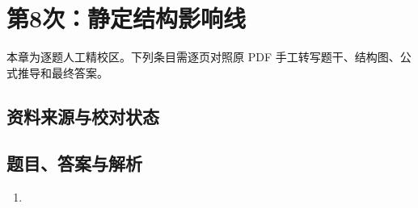 \chapter{第8次：静定结构影响线}

本章为逐题人工精校区。下列条目需逐页对照原 PDF 手工转写题干、结构图、公式推导和最终答案。

\section{资料来源与校对状态}


\section{题目、答案与解析}

\begin{enumerate}[label=\textbf{第\arabic*题},wide]
  \item
  \begin{problemBox}
  \end{problemBox}

  \begin{solutionBox}
  \end{solutionBox}
\end{enumerate}
